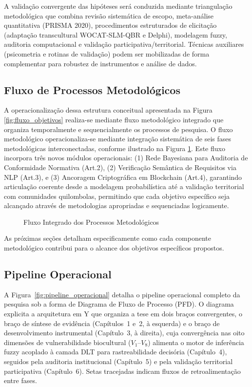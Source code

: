 A validação convergente das hipóteses será conduzida mediante triangulação metodológica que combina revisão sistemática de escopo, meta-análise quantitativa (PRISMA 2020), procedimentos estruturados de elicitação (adaptação transcultural WOCAT-SLM-QBR e Delphi), modelagem fuzzy, auditoria computacional e validação participativa/territorial. Técnicas auxiliares (psicometria e rotinas de validação) podem ser mobilizadas de forma complementar para robustez de instrumentos e análise de dados.

\subsection{Fluxo de Processos Metodológicos}

A operacionalização dessa estrutura conceitual apresentada na Figura \ref{fig:fluxo_objetivos} realiza-se mediante fluxo metodológico integrado que organiza temporalmente e sequencialmente os processos de pesquisa. O fluxo metodológico operacionaliza-se mediante integração sistemática de seis fases metodológicas interconectadas, conforme ilustrado na Figura \ref{fig:fluxo_processos}. Este fluxo incorpora três novos módulos operacionais: (1) Rede Bayesiana para Auditoria de Conformidade Normativa (Art.2), (2) Verificação Semântica de Requisitos via NLP (Art.3), e (3) Ancoragem Criptográfica em Blockchain (Art.4), garantindo articulação coerente desde a modelagem probabilística até a validação territorial com comunidades quilombolas, permitindo que cada objetivo específico seja alcançado através de metodologias apropriadas e sequenciadas logicamente.

\begin{figure}[H]
  \centering
  \caption{Fluxo Integrado dos Processos Metodológicos}
  \resizebox{\textwidth}{!}{%
  }
  \label{fig:fluxo_processos}
\end{figure}

As próximas seções detalham especificamente como cada componente metodológico contribui para o alcance dos objetivos específicos propostos.

\subsection{Pipeline Operacional}

A Figura~\ref{fig:pipeline_operacional} detalha o pipeline operacional completo da pesquisa sob a forma de Diagrama de Fluxo de Processo (PFD). O diagrama explicita a arquitetura em Y que organiza a tese em dois braços convergentes, o braço de síntese de evidência (Capítulos~1 e~2, à esquerda) e o braço de desenvolvimento instrumental (Capítulo~3, à direita), cuja convergência nas oito dimensões de vulnerabilidade biocultural ($V_1$--$V_8$) alimenta o motor de inferência fuzzy acoplado à camada DLT para rastreabilidade decisória (Capítulo~4), seguidos pela auditoria institucional (Capítulo~5) e pela validação territorial participativa (Capítulo~6). Setas tracejadas indicam fluxos de retroalimentação entre fases.

